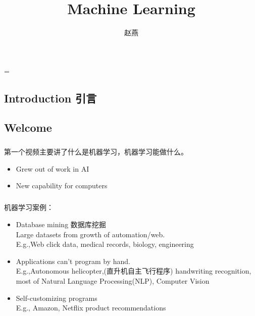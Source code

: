 \documentclass{article}
\title{Machine Learning}
\author{赵燕}
\date{}
\begin{document}
 
\hfuzz=\maxdimen
{}
\begin{CJK}{UTF8}{gbsn} 
\maketitle
\renewcommand\contentsname{目录}
\tableofcontents
\newpage

\section{Introduction 引言}
\subsection{Welcome}
\subparagraph*{}
 第一个视频主要讲了什么是机器学习，机器学习能做什么。
\begin{itemize}
  \item Grew out of work in AI
  \item New capability for computers
\end{itemize}
\subparagraph*{}
 机器学习案例：
\begin{itemize}
  \item Database mining 数据库挖掘\\
   Large datasets from growth of automation/web.\\
   E.g.,Web click data, medical records, biology, engineering
  \item Applications can't program by hand.\\
   E.g.,Autonomous helicopter,(直升机自主飞行程序) handwriting recognition, most of Natural Language Processing(NLP), Computer Vision
  \item Self-customizing programs\\
   E.g., Amazon, Netflix product recommendations
\end{itemize}

\end{CJK}
\end{document}
